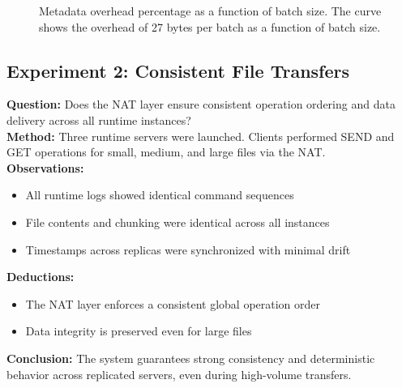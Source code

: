 \documentclass[10pt]{IEEEtran}
\begin{document}
\begin{figure}[h]
\centering
{}
\caption{Metadata overhead percentage as a function of batch size. The curve shows the overhead of 27 bytes per batch as a function of batch size.}
\label{fig:overhead}
\end{figure}\subsection{Experiment 2: Consistent File Transfers}
\textbf{Question:} Does the NAT layer ensure consistent operation ordering and data delivery across all runtime instances? \\
\textbf{Method:} Three runtime servers were launched. Clients performed SEND and GET operations for small, medium, and large files via the NAT. \\
\textbf{Observations:}
\begin{itemize}
    \item All runtime logs showed identical command sequences
    \item File contents and chunking were identical across all instances
    \item Timestamps across replicas were synchronized with minimal drift
\end{itemize}
\textbf{Deductions:}
\begin{itemize}
    \item The NAT layer enforces a consistent global operation order
    \item Data integrity is preserved even for large files
\end{itemize}
\textbf{Conclusion:} The system guarantees strong consistency and deterministic behavior across replicated servers, even during high-volume transfers.
\end{document}
